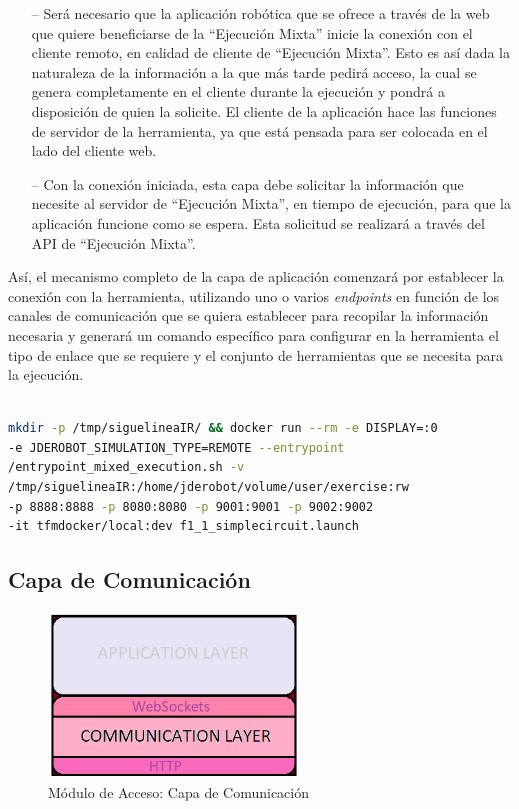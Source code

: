 \begin{itemize}
    \item [--] Será necesario que la aplicación robótica que se ofrece a través de la web que quiere beneficiarse de la ``Ejecución Mixta'' inicie la conexión con el cliente remoto, en calidad de cliente de ``Ejecución Mixta''. Esto es así dada la naturaleza de la información a la que más tarde pedirá acceso, la cual se genera completamente en el cliente durante la ejecución y pondrá a disposición de quien la solicite. El cliente de la aplicación hace las funciones de servidor de la herramienta, ya que está pensada para ser colocada en el lado del cliente web.
    \item [--] Con la conexión iniciada, esta capa debe solicitar la información que necesite al servidor de ``Ejecución Mixta'', en tiempo de ejecución, para que la aplicación funcione como se espera. Esta solicitud se realizará a través del API de ``Ejecución Mixta''.
\end{itemize}

Así, el mecanismo completo de la capa de aplicación comenzará por establecer la conexión con la herramienta, utilizando uno o varios \textit{endpoints} en función de los canales de comunicación que se quiera establecer para recopilar la información necesaria y generará un comando específico para configurar en la herramienta el tipo de enlace que se requiere y el conjunto de herramientas que se necesita para la ejecución.

\begin{lstlisting}[language=bash, caption=Comando de configuración de Ejecución Mixta]

mkdir -p /tmp/siguelineaIR/ && docker run --rm -e DISPLAY=:0
-e JDEROBOT_SIMULATION_TYPE=REMOTE --entrypoint 
/entrypoint_mixed_execution.sh -v 
/tmp/siguelineaIR:/home/jderobot/volume/user/exercise:rw 
-p 8888:8888 -p 8080:8080 -p 9001:9001 -p 9002:9002 
-it tfmdocker/local:dev f1_1_simplecircuit.launch

\end{lstlisting}


\subsection{Capa de Comunicación}

\begin{figure}[!hbtp]  \centering\noindent
    \includegraphics[width=0.6\textwidth]{figures/layer3.png}
    \caption{Módulo de Acceso: Capa de Comunicación}
    \label{layer3}
\end{figure}

